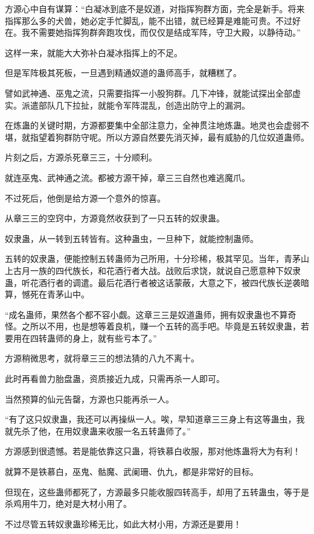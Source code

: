 \begin{this_body}
方源心中自有谋算：“白凝冰到底不是奴道，对指挥狗群方面，完全是新手。将来指挥那么多的犬兽，她必定手忙脚乱，能不出错，就已经算是难能可贵。不过好在。我不需要她指挥狗群奔跑攻伐，而仅仅是结成军阵，守卫大殿，以静待动。”

这样一来，就能大大弥补白凝冰指挥上的不足。

但是军阵极其死板，一旦遇到精通奴道的蛊师高手，就糟糕了。

譬如武神通、巫鬼之流，只需要指挥一小股狗群。几下冲锋，就能试探出全部虚实。派遣部队几下拉扯，就能令军阵混乱，创造出防守上的漏洞。

在炼蛊的关键时期，方源都要集中全部注意力，全神贯注地炼蛊。地灵也会虚弱不堪，就指望着狗群防守呢。所以方源自然要先消灭掉，最有威胁的几位奴道蛊师。

片刻之后，方源杀死章三三，十分顺利。

就连巫鬼、武神通之流。都被方源干掉，章三三自然也难逃魔爪。

不过死后，他倒是给方源一个意外的惊喜。

从章三三的空窍中，方源竟然收获到了一只五转的奴隶蛊。

奴隶蛊，从一转到五转皆有。这种蛊虫，一旦种下，就能控制蛊师。

五转的奴隶蛊，便能控制五转蛊师为己所用，十分珍稀，极其罕见。当年，青茅山上古月一族的四代族长，和花酒行者大战。战败后求饶，就说自己愿意种下奴隶蛊，听花酒行者的调遣。最后花酒行者被这话蒙蔽，大意之下，被四代族长逆袭暗算，憾死在青茅山中。

“成名蛊师，果然各个都不容小觑。这章三三是奴道蛊师，拥有奴隶蛊也不算奇怪。之所以不用，也是想等着良机，赚一个五转的高手吧。毕竟是五转奴隶蛊，若要用在四转蛊师的身上，就有些亏本了。”

方源稍微思考，就将章三三的想法猜的八九不离十。

此时再看兽力胎盘蛊，资质接近九成，只需再杀一人即可。

当然预算的仙元告罄，方源也只能再杀一人。

“有了这只奴隶蛊，我还可以再操纵一人。唉，早知道章三三身上有这等蛊虫，我就先杀了他，在用奴隶蛊来收服一名五转蛊师了。”

方源感到很遗憾。若是能依靠这只蛊，将铁慕白收服，那对他炼蛊将大为有利！

就算不是铁慕白，巫鬼、骷魔、武阑珊、仇九，都是非常好的目标。

但现在，这些蛊师都死了，方源最多只能收服四转高手，却用了五转蛊虫，等于是杀鸡用牛刀，绝对是大材小用了。

不过尽管五转奴隶蛊珍稀无比，如此大材小用，方源还是要用！


\end{this_body}
